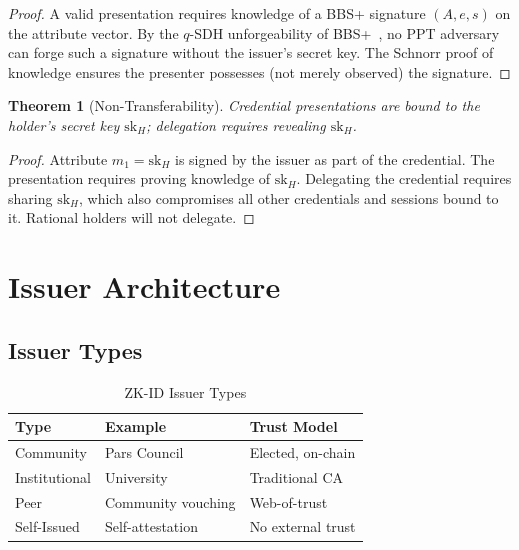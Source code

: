\documentclass[11pt,a4paper]{article}
\newtheorem{theorem}{Theorem}[section]
\begin{document}
\begin{proof}
    A valid presentation requires knowledge of a BBS+ signature
    $(A, e, s)$ on the attribute vector.  By the $q$-SDH unforgeability
    of BBS+~\cite{au2006constant}, no PPT adversary can forge such a
    signature without the issuer's secret key.  The Schnorr proof of
    knowledge ensures the presenter possesses (not merely observed) the
    signature.
\end{proof}

\begin{theorem}[Non-Transferability]
    Credential presentations are bound to the holder's secret key
    $\mathrm{sk}_H$; delegation requires revealing $\mathrm{sk}_H$.
\end{theorem}

\begin{proof}
    Attribute $m_1 = \mathrm{sk}_H$ is signed by the issuer as part of
    the credential.  The presentation requires proving knowledge of
    $\mathrm{sk}_H$.  Delegating the credential requires sharing
    $\mathrm{sk}_H$, which also compromises all other credentials and
    sessions bound to it.  Rational holders will not delegate.
\end{proof}

\section{Issuer Architecture}
\label{sec:issuer}

\subsection{Issuer Types}

\begin{table}[h]
\centering
\caption{ZK-ID Issuer Types}
\label{tab:issuers}
\begin{tabular}{@{}lll@{}}
\toprule
\textbf{Type} & \textbf{Example} & \textbf{Trust Model} \\
\midrule
Community      & Pars Council       & Elected, on-chain \\
Institutional  & University         & Traditional CA \\
Peer           & Community vouching & Web-of-trust \\
Self-Issued    & Self-attestation   & No external trust \\
\bottomrule
\end{tabular}
\end{table}
\end{document}
